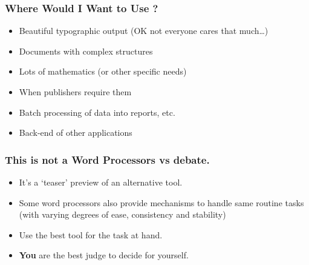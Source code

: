 \begin{frame}
\frametitle{Where Would I Want to Use ?}
\begin{itemize}
\item Beautiful typographic output \pause(OK not everyone cares that much\ldots)
\item Documents with complex structures
\item Lots of mathematics \pause(or other specific needs)\pause
\item When publishers \alert{require} them
\item Batch processing of data into reports, etc.
\pause
\item Back-end of other applications
\end{itemize}
\end{frame}


\begin{frame}
\frametitle{This is not a Word Processors vs  debate.}
\begin{itemize}
\item It's a `teaser' preview of an alternative tool.
\item Some word processors also provide mechanisms to handle same routine tasks (with varying degrees of ease, consistency and stability)
\item Use the best tool for the task at hand.
\item \textbf{\alert{You}} are the best judge to decide for yourself.
\end{itemize}
\end{frame}


